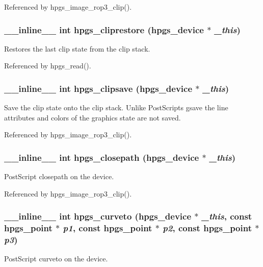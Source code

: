Referenced by hpgs\_\-image\_\-rop3\_\-clip().

\subsubsection[{hpgs\_\-cliprestore}]{\setlength{\rightskip}{0pt plus 5cm}\_\-\_\-inline\_\-\_\- int hpgs\_\-cliprestore ({\bf hpgs\_\-device} $\ast$ {\em \_\-this})\hspace{0.3cm}{\ttfamily  [static]}}\label{group__device_ga6a627914eb54773183a02b05db2818b4}
Restores the last clip state from the clip stack. 

Referenced by hpgs\_\-read().

\subsubsection[{hpgs\_\-clipsave}]{\setlength{\rightskip}{0pt plus 5cm}\_\-\_\-inline\_\-\_\- int hpgs\_\-clipsave ({\bf hpgs\_\-device} $\ast$ {\em \_\-this})\hspace{0.3cm}{\ttfamily  [static]}}\label{group__device_gad4d626725fee547a5a5ab6559ad0de09}
Save the clip state onto the clip stack. Unlike PostScripts {\ttfamily gsave} the line attributes and colors of the graphics state are not saved. 

Referenced by hpgs\_\-image\_\-rop3\_\-clip().

\subsubsection[{hpgs\_\-closepath}]{\setlength{\rightskip}{0pt plus 5cm}\_\-\_\-inline\_\-\_\- int hpgs\_\-closepath ({\bf hpgs\_\-device} $\ast$ {\em \_\-this})\hspace{0.3cm}{\ttfamily  [static]}}\label{group__device_ga57e1b5cd052096b4dc60ca719a6e0f9c}
PostScript closepath on the device. 

Referenced by hpgs\_\-image\_\-rop3\_\-clip().

\subsubsection[{hpgs\_\-curveto}]{\setlength{\rightskip}{0pt plus 5cm}\_\-\_\-inline\_\-\_\- int hpgs\_\-curveto ({\bf hpgs\_\-device} $\ast$ {\em \_\-this}, \/  const {\bf hpgs\_\-point} $\ast$ {\em p1}, \/  const {\bf hpgs\_\-point} $\ast$ {\em p2}, \/  const {\bf hpgs\_\-point} $\ast$ {\em p3})\hspace{0.3cm}{\ttfamily  [static]}}\label{group__device_gae9c2bf3ad746f0db9b981cfb51254001}
PostScript curveto on the device. 
